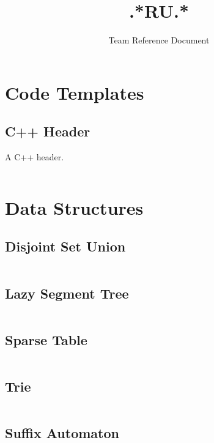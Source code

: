 \documentclass[8pt,a4paper,landscape,oneside]{amsart}
\title{.*RU.*}
\subtitle{Team Reference Document}
\date{\ddmmyyyydate{\today{}}}
\newcommand{\code}[1]{\inputminted[fontsize=\normalsize,baselinestretch=1]{cpp}{_code/#1}}
\begin{document}
\begin{multicols*}{3}
\maketitle
\thispagestyle{fancy}
\vspace{-3em}
\tableofcontents



\section{Code Templates}

    \subsection{C++ Header}
        A C++ header.
        \code{header.cpp}

\section{Data Structures}

	\subsection{Disjoint Set Union}
	
	\code{data-structures/dsu.cpp}
	
	\subsection{Lazy Segment Tree}
	
	\code{data-structures/lazy_segment_tree.cpp}
	
	\subsection{Sparse Table}
	
	\code{data-structures/sparse_table.cpp}
	
	\subsection{Trie}
	
	\code{data-structures/trie.cpp}
	
	\subsection{Suffix Automaton}
	

\end{multicols*}
\end{document}
